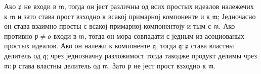 \documentclass[11pt]{article}
\providecommand{\mm}{\mathfrak{m}}
\providecommand{\mo}{\mathfrak{o}}
\providecommand{\mq}{\mathfrak{q}}
\providecommand{\mpideal}{\mathfrak{p}}
\begin{document}
Ако $\mpideal$ не входи в $\mm$, тогда он јест различны од всих простых идеалов належечих к $\mm$ и зато става прост взходно к всакој примарној компоненте и к $\mm$; Једночасно он става взаимно просты с всакој примарној компонентоју и тым с $\mm$. Ако противно $\mpideal\ne\mo$ входи в $\mm$, тогда он мора совпадати с једным из асоциованых простых идеалов. Ако он належи к компоненте $\mq$, тогда $\mq:\mpideal$ става властны делитель од $\mq$; чрез једнозначну разложимост тогда такодже продукт делимы чрез $\mm:\mpideal$ става властны делитель од $\mm$. Зато $\mpideal$ не јест прост взходно к $\mm$.
\end{document}
